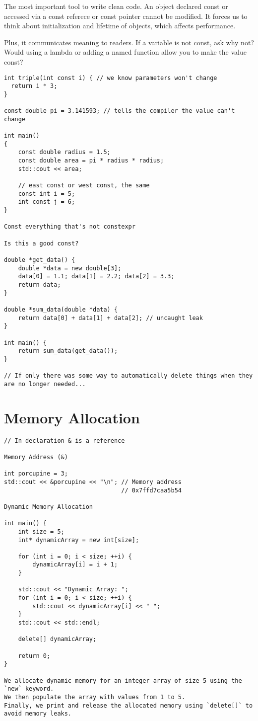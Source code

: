 The most important tool to write clean code.
An object declared const or accessed via a const referece or const pointer cannot be modified.
It forces us to think about initialization and lifetime of objects, which affects performance. 

Plus, it communicates meaning to readers. 
If a variable is not const, ask why not?
Would using a lambda or adding a named function allow you to make the value const?

\begin{verbatim}
int triple(int const i) { // we know parameters won't change
  return i * 3;
}

const double pi = 3.141593; // tells the compiler the value can't change

int main()
{
    const double radius = 1.5;
    const double area = pi * radius * radius;
    std::cout << area;

    // east const or west const, the same
    const int i = 5;
    int const j = 6;
}

Const everything that's not constexpr

Is this a good const?

double *get_data() {
    double *data = new double[3];
    data[0] = 1.1; data[1] = 2.2; data[2] = 3.3;
    return data;
}

double *sum_data(double *data) {
    return data[0] + data[1] + data[2]; // uncaught leak
}

int main() {
    return sum_data(get_data());
}

// If only there was some way to automatically delete things when they are no longer needed...
\end{verbatim}


\section{Memory Allocation}

\begin{verbatim}
// In declaration & is a reference

Memory Address (&)

int porcupine = 3;
std::cout << &porcupine << "\n"; // Memory address
                                 // 0x7ffd7caa5b54

Dynamic Memory Allocation

int main() {
    int size = 5;
    int* dynamicArray = new int[size];

    for (int i = 0; i < size; ++i) {
        dynamicArray[i] = i + 1;
    }

    std::cout << "Dynamic Array: ";
    for (int i = 0; i < size; ++i) {
        std::cout << dynamicArray[i] << " ";
    }
    std::cout << std::endl;

    delete[] dynamicArray;

    return 0;
}

We allocate dynamic memory for an integer array of size 5 using the `new` keyword.
We then populate the array with values from 1 to 5.
Finally, we print and release the allocated memory using `delete[]` to avoid memory leaks.
\end{verbatim}

